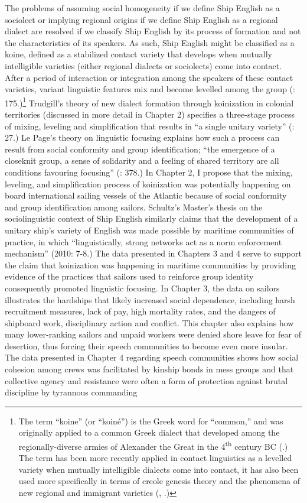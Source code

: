   The problems of assuming social homogeneity if we define Ship English as a sociolect or implying regional origins if we define Ship English as a regional dialect are resolved if we classify Ship English by its process of formation and not the characteristics of its speakers. As such, Ship English might be classified as a koine, defined as a stabilized contact variety that develops when mutually intelligible varieties (either regional dialects or sociolects) come into contact. After a period of interaction or integration among the speakers of these contact varieties, variant linguistic features mix and become levelled among the group (\citealt{Siegel2001}: 175.)\footnote{The term “koine” (or “koiné”) is the Greek word for “common,” and was originally applied to a common Greek dialect that developed among the regionally-diverse armies of Alexander the Great in the 4\textsuperscript{th} century BC (\citealt{Andriotis1995}.) The term has been more recently applied in contact linguistics as a levelled variety when mutually intelligible dialects come into contact, it has also been used more specifically in terms of creole genesis theory \citep{Siegel2001} and the phenomena of new regional and immigrant varieties (\citealt{Trudgill1986}, \citealt{Kerswill2004}.)} Trudgill’s theory of new dialect formation through koinization in colonial territories (discussed in more detail in Chapter 2) specifies a three-stage process of mixing, leveling and simplification that results in “a single unitary variety” (\citealt{Trudgill1986}: 27.) Le Page’s theory on linguistic focusing explains how such a process can result from social conformity and group identification; “the emergence of a closeknit group, a sense of solidarity and a feeling of shared territory are all conditions favouring focusing” (\citealt{Milroy1986}: 378.) In Chapter 2, I propose that the mixing, leveling, and simplification process of koinization was potentially happening on board international sailing vessels of the Atlantic because of social conformity and group identification among sailors. Schultz’s Master’s thesis on the sociolinguistic context of Ship English similarly claims that the development of a unitary ship’s variety of English was made possible by maritime communities of practice, in which “linguistically, strong networks act as a norm enforcement mechanism” (2010: 7-8.) The data presented in Chapters 3 and 4 serve to support the claim that koinization was happening in maritime communities by providing evidence of the practices that sailors used to reinforce group identity consequently promoted linguistic focusing. In Chapter 3, the data on sailors illustrates the hardships that likely increased social dependence, including harsh recruitment measures, lack of pay, high mortality rates, and the dangers of shipboard work, disciplinary action and conflict. This chapter also explains how many lower-ranking sailors and unpaid workers were denied shore leave for fear of desertion, thus forcing their speech communities to become even more insular. The data presented in Chapter 4 regarding speech communities shows how social cohesion among crews was facilitated by kinship bonds in mess groups and that collective agency and resistance were often a form of protection against brutal discipline by tyrannous commanding 